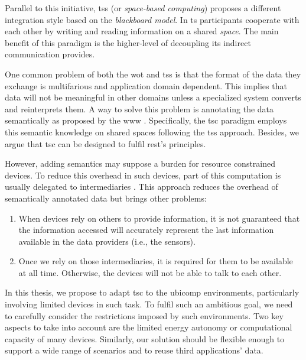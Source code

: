 
Parallel to this initiative, \aclp{ts} (or \emph{space-based computing}) \citep{gelernter_generative_1985} proposes a different integration style based on the \emph{blackboard model}.
In \ac{ts} participants cooperate with each other by writing and reading information on a shared \emph{space}.
The main benefit of this paradigm is the higher-level of decoupling its indirect communication provides. %


\bigskip

One common problem of both the \ac{wot} and \aclp{ts} is that the format of the data they exchange is multifarious and application domain dependent.
This implies that data will not be meaningful in other domains unless a specialized system converts and reinterprets them.
A way to solve this problem is annotating the data semantically as proposed by the \ac{www} \citep{berners-lee_semantic_2001}.
Specifically, the \ac{tsc} paradigm \citep{fensel_triple-space_2004} employs this semantic knowledge on shared spaces following the \aclp{ts} approach.
Besides, we argue that \ac{tsc} can be designed to fulfil \ac{rest}'s principles.


However, adding semantics may suppose a burden for resource constrained devices.
To reduce this overhead in such devices, part of this computation is usually delegated to intermediaries \citep{honkola_smart-m3_2010}. %
This approach reduces the overhead of semantically annotated data but brings other problems:
\begin{enumerate}
 \item When devices rely on others to provide information, it is not guaranteed that the information accessed will accurately represent the last information available in the data providers (i.e., the sensors).
 \item Once we rely on those intermediaries, it is required for them to be available at all time.
	Otherwise, the devices will not be able to talk to each other.
\end{enumerate}


\bigskip


In this thesis, we propose to adapt \ac{tsc} to the \ac{ubicomp} environments, particularly involving limited devices in such task.
To fulfil such an ambitious goal, we need to carefully consider the restrictions imposed by such environments.
Two key aspects to take into account are the limited energy autonomy or computational capacity of many devices.
Similarly, our solution should be flexible enough to support a wide range of scenarios and to reuse third applications' data.


